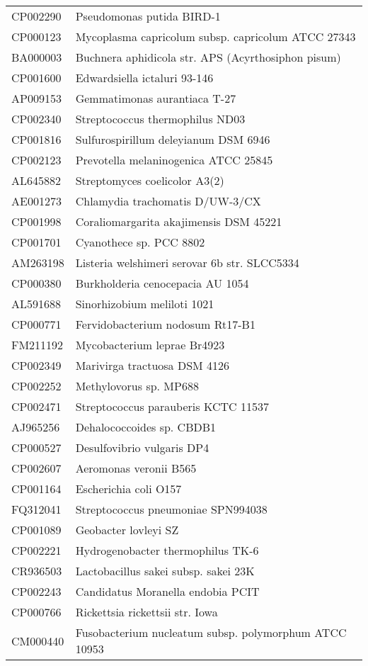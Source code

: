 \begin{longtable}{ll}
CP002290 & Pseudomonas putida BIRD-1\\
CP000123 & Mycoplasma capricolum subsp. capricolum ATCC 27343\\
BA000003 & Buchnera aphidicola str. APS (Acyrthosiphon pisum)\\
CP001600 & Edwardsiella ictaluri 93-146\\
AP009153 & Gemmatimonas aurantiaca T-27\\
CP002340 & Streptococcus thermophilus ND03\\
CP001816 & Sulfurospirillum deleyianum DSM 6946\\
CP002123 & Prevotella melaninogenica ATCC 25845\\
AL645882 & Streptomyces coelicolor A3(2)\\
AE001273 & Chlamydia trachomatis D/UW-3/CX\\
CP001998 & Coraliomargarita akajimensis DSM 45221\\
CP001701 & Cyanothece sp. PCC 8802\\
AM263198 & Listeria welshimeri serovar 6b str. SLCC5334\\
CP000380 & Burkholderia cenocepacia AU 1054\\
AL591688 & Sinorhizobium meliloti 1021\\
CP000771 & Fervidobacterium nodosum Rt17-B1\\
FM211192 & Mycobacterium leprae Br4923\\
CP002349 & Marivirga tractuosa DSM 4126\\
CP002252 & Methylovorus sp. MP688\\
CP002471 & Streptococcus parauberis KCTC 11537\\
AJ965256 & Dehalococcoides sp. CBDB1\\
CP000527 & Desulfovibrio vulgaris DP4\\
CP002607 & Aeromonas veronii B565\\
CP001164 & Escherichia coli O157\\
FQ312041 & Streptococcus pneumoniae SPN994038\\
CP001089 & Geobacter lovleyi SZ\\
CP002221 & Hydrogenobacter thermophilus TK-6\\
CR936503 & Lactobacillus sakei subsp. sakei 23K\\
CP002243 & Candidatus Moranella endobia PCIT\\
CP000766 & Rickettsia rickettsii str. Iowa\\
CM000440 & Fusobacterium nucleatum subsp. polymorphum ATCC 10953\\

\end{longtable}
